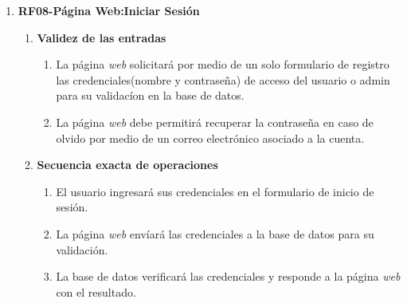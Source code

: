 \begin{enumerate}
\begin{enumerate}
                \item \textbf{Efecto de los parámetros}
                    \begin{enumerate}
                        \item El entorno de \textit{front end} de la página \textit{web} deberá poder permitir tener múltiples usuarios conectados de manera simultánea sin degradar el rendimiento.
                        \item El entorno de \textit{front end} de la página \textit{web} deberá escalar gráficos según el volumen de información obtenida de la base de datos.
                    \end{enumerate}   
            
                \item \textbf{Relación entre las salidas y las entradas}
                    \begin{enumerate}
                        \item El entorno de \textit{front end} de la página web deberá  permitir una conexión bidireccional con la base de datos para enviar y recibir datos en tiempo real.
                    \end{enumerate}
        \end{enumerate}

    \item \label{it:RF08}  \textbf{RF08-Página Web:Iniciar Sesión}
        \begin{enumerate}
                \item \textbf{Validez de las entradas}
                    \begin{enumerate}
                        \item La página \textit{web} solicitará por medio de un solo formulario de registro 
                        las credenciales(nombre y contraseña) de acceso del usuario o admin para su validacíon en la base de datos.
                        \item La página \textit{web} debe permitirá recuperar la contraseña en caso de olvido por medio de un correo electrónico asociado a la cuenta.
                    \end{enumerate}   
                
                \item \textbf{Secuencia exacta de operaciones}
                    \begin{enumerate}
                        \item El usuario ingresará sus credenciales en el formulario de inicio de sesión.
                        \item La página \textit{web} envíará las credenciales a la base de datos para su validación.
                        \item La base de datos verificará las credenciales y responde a la página \textit{web} con el resultado.
                    \end{enumerate}   
            

\end{enumerate}
\end{enumerate}
